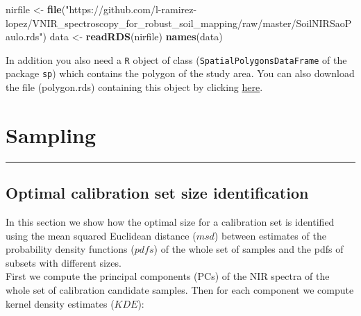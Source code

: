 \documentclass[]{book}
\newenvironment{Shaded}{\begin{snugshade}}{\end{snugshade}}
\newcommand{\KeywordTok}[1]{\textcolor[rgb]{0.13,0.29,0.53}{\textbf{#1}}}
\newcommand{\NormalTok}[1]{#1}
\newcommand{\StringTok}[1]{\textcolor[rgb]{0.31,0.60,0.02}{#1}}
\begin{document}
\begin{Shaded}
\begin{Highlighting}[]
\NormalTok{nirfile <-}\StringTok{ }\KeywordTok{file}\NormalTok{(}\StringTok{"https://github.com/l-ramirez-lopez/VNIR_spectroscopy_for_robust_soil_mapping/raw/master/SoilNIRSaoPaulo.rds"}\NormalTok{)}
\NormalTok{data <-}\StringTok{ }\KeywordTok{readRDS}\NormalTok{(nirfile)}
\KeywordTok{names}\NormalTok{(data)}
\end{Highlighting}
\end{Shaded}

In addition you also need a \texttt{R} object of class (\texttt{SpatialPolygonsDataFrame} of the package \texttt{sp}) which contains the polygon of the study area. You can also download the file (polygon.rds) containing this object by clicking \href{https://github.com/l-ramirez-lopez/VNIR_spectroscopy_for_robust_soil_mapping/raw/master/polygon.rds}{here}.

\hypertarget{sampling}{%
\chapter{Sampling}\label{sampling}}

\begin{center}\rule{0.5\linewidth}{\linethickness}\end{center}

\hypertarget{optimal-calibration-set-size-identification}{%
\section{Optimal calibration set size identification}\label{optimal-calibration-set-size-identification}}

In this section we show how the optimal size for a calibration set is identified using the mean squared
Euclidean distance (\(msd\)) between estimates of the probability density functions (\(pdfs\)) of the whole set of samples and the pdfs of subsets with different sizes.\\
First we compute the principal components (PCs) of the NIR spectra of the whole set of calibration candidate samples. Then for each component we compute kernel density estimates (\(KDE\)):
\end{document}
